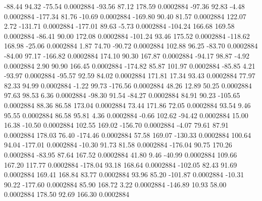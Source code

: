       -88.44       94.32      -75.54     0.0002884
      -93.56       87.12      178.59     0.0002884
      -97.36       92.83       -4.48     0.0002884
     -177.34       81.76      -10.69     0.0002884
     -169.80       90.40       81.57     0.0002884
      122.07        2.72     -131.71     0.0002884
     -177.01       89.63       -5.73     0.0002884
     -104.24      166.68      169.58     0.0002884
      -86.41       90.00      172.08     0.0002884
     -101.24       93.46      175.52     0.0002884
     -118.62      168.98      -25.06     0.0002884
        1.87       74.70      -90.72     0.0002884
      102.88       96.25      -83.70     0.0002884
      -84.00       97.17     -166.82     0.0002884
      174.10       90.30      167.87     0.0002884
      -94.17       98.87       -4.92     0.0002884
        2.90       90.90      166.45     0.0002884
     -174.82       85.87      101.97     0.0002884
      -85.85        4.21      -93.97     0.0002884
      -95.57       92.59       84.02     0.0002884
      171.81       17.34       93.43     0.0002884
       77.97       82.33       94.99     0.0002884
       -1.22       99.73     -176.56     0.0002884
       48.26       12.89       50.25     0.0002884
       97.63       98.53        6.36     0.0002884
      -98.30       91.54      -84.27     0.0002884
       84.91       90.23     -105.65     0.0002884
       88.36       86.58      173.04     0.0002884
       73.44      171.86       72.05     0.0002884
       93.54        9.46       95.55     0.0002884
       86.58       95.81        4.36     0.0002884
       -0.66      102.62      -94.42     0.0002884
       15.00       16.38      -10.50     0.0002884
      102.55      169.02     -156.70     0.0002884
       -4.07       79.61       87.91     0.0002884
      178.03       76.40     -174.46     0.0002884
       57.58      169.07     -130.33     0.0002884
      100.64       94.04     -177.01     0.0002884
      -10.30       91.73       81.58     0.0002884
     -176.04       90.75      170.26     0.0002884
      -83.95       87.64      167.52     0.0002884
       41.80        9.46      -40.99     0.0002884
      109.66      167.20      117.77     0.0002884
     -178.04       93.18      168.64     0.0002884
     -102.05       82.43       91.69     0.0002884
      169.41      168.84       83.77     0.0002884
       93.96       85.20     -101.87     0.0002884
      -10.31       90.22     -177.60     0.0002884
       85.90      168.72        3.22     0.0002884
     -146.89       10.93       58.00     0.0002884
      178.50       92.69      166.30     0.0002884
